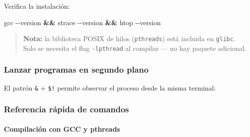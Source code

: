 \documentclass[
  spanish,
]{article}
\newenvironment{Shaded}{}{}
\newcommand{\AttributeTok}[1]{\textcolor[rgb]{0.49,0.56,0.16}{#1}}
\newcommand{\CommentTok}[1]{\textcolor[rgb]{0.38,0.63,0.69}{\textit{#1}}}
\newcommand{\ExtensionTok}[1]{#1}
\newcommand{\FunctionTok}[1]{\textcolor[rgb]{0.02,0.16,0.49}{#1}}
\newcommand{\KeywordTok}[1]{\textcolor[rgb]{0.00,0.44,0.13}{\textbf{#1}}}
\newcommand{\NormalTok}[1]{#1}
\newcommand{\OperatorTok}[1]{\textcolor[rgb]{0.40,0.40,0.40}{#1}}
\newcommand{\VariableTok}[1]{\textcolor[rgb]{0.10,0.09,0.49}{#1}}
\begin{document}
Verifica la instalación:

\begin{Shaded}
\begin{Highlighting}[]
\FunctionTok{gcc} \AttributeTok{{-}{-}version} \KeywordTok{\&\&} \ExtensionTok{strace} \AttributeTok{{-}{-}version} \KeywordTok{\&\&} \ExtensionTok{htop} \AttributeTok{{-}{-}version}
\end{Highlighting}
\end{Shaded}

\begin{quote}
\textbf{Nota:} la biblioteca POSIX de hilos (\texttt{pthreads}) está
incluida en \texttt{glibc}. Solo se necesita el flag \texttt{-lpthread}
al compilar --- no hay paquete adicional.
\end{quote}

\subsubsection{Lanzar programas en segundo
plano}\label{lanzar-programas-en-segundo-plano}

El patrón \texttt{\&} + \texttt{\$!} permite observar el proceso desde
la misma terminal:

\begin{Shaded}
\end{Shaded}

\subsubsection{Referencia rápida de
comandos}\label{referencia-ruxe1pida-de-comandos}

\paragraph{Compilación con GCC y
pthreads}\label{compilaciuxf3n-con-gcc-y-pthreads}
\end{document}
